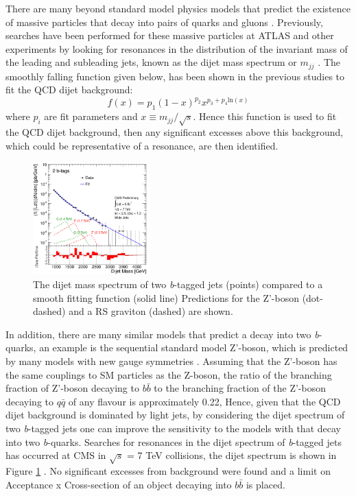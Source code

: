 \documentclass[12pt, onecolumn,notitlepage]{article}
\begin{document}
There are many beyond standard model physics models that predict the existence of massive particles
that decay into pairs of quarks and gluons \cite{bib_qstar, bib_W', bib_W*, bib_color_octet}.
Previously, searches have been performed for these massive particles at ATLAS and other experiments by looking for resonances in the
distribution of the invariant mass of the leading and subleading jets, known as the dijet mass spectrum or $m_{jj}$ \cite{bib_ATLAS_dijet, bib_dijet}.
The smoothly falling function given below, has been shown in the previous studies to fit the QCD dijet background:
\begin{equation}
  f(x) = p_1(1-x)^{p_2}x^{p_3+p_4\text{ln}(x)}
  \label{dijet_fit}
\end{equation}
where $p_i$ are fit parameters and $x \equiv m_{jj}/\sqrt{s}$. 
Hence this function is used to fit the QCD dijet background,
 then any significant excesses above this background, 
which could be representative of a resonance, are then identified.
 
\begin{figure}[!bht]
  \begin{center}
	 \includegraphics[width=0.4\textwidth]{figures/CMS_dibjet.pdf}
	 \caption{The dijet mass spectrum of two \textit{b}-tagged jets (points) compared to a smooth fitting function (solid line)
           Predictions for the Z'-boson (dot-dashed) and a RS graviton (dashed) are shown.}
         \label{CMS_dibjet}
         \vspace{-0.2cm}
  \end{center}
\end{figure}


In addition, there are many similar models that predict a decay into two \textit{b}-quarks,
an example is the sequential standard model Z'-boson, which is predicted by many models with new gauge symmetries \cite{bib_Z'}.
Assuming that the Z'-boson has the same couplings to SM particles as the Z-boson, the ratio of the branching fraction
of Z'-boson decaying to $b\bar{b}$ to the branching fraction of the Z'-boson decaying to $q\bar{q}$ of any flavour is approximately 0.22,
Hence, given that the QCD dijet background is dominated by light jets, 
by considering the dijet spectrum of two \textit{b}-tagged jets one can improve the sensitivity to the models 
with that decay into two \textit{b}-quarks.
Searches for resonances in the dijet spectrum of \textit{b}-tagged jets has occurred at CMS in $\sqrt{s}$ = 7 TeV collisions,
the dijet spectrum is shown in Figure \ref{CMS_dibjet} \cite{bib_CMS_dibjet}.
No significant excesses from background were found and a limit on Acceptance x Cross-section 
of an object decaying into $b\bar{b}$ is placed. \\
\end{document}
